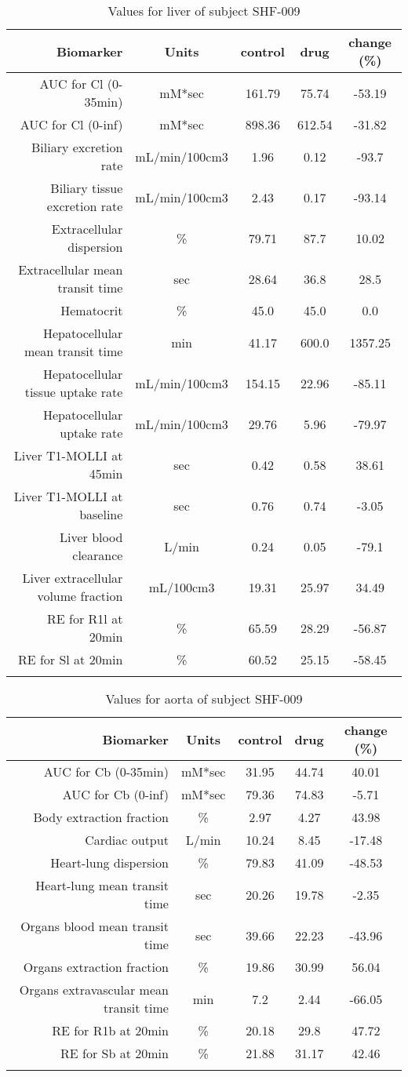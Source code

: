 \documentclass{epflreport}%
\begin{document}
%
\clearpage%
\begin{longtable}{rcccc}%
\hline%
Biomarker&Units&control&drug&change (\%)\\%
\hline%
AUC for Cl (0{-}35min)&mM*sec&161.79&75.74&{-}53.19\\%
AUC for Cl (0{-}inf)&mM*sec&898.36&612.54&{-}31.82\\%
Biliary excretion rate&mL/min/100cm3&1.96&0.12&{-}93.7\\%
Biliary tissue excretion rate&mL/min/100cm3&2.43&0.17&{-}93.14\\%
Extracellular dispersion&\%&79.71&87.7&10.02\\%
Extracellular mean transit time&sec&28.64&36.8&28.5\\%
Hematocrit&\%&45.0&45.0&0.0\\%
Hepatocellular mean transit time&min&41.17&600.0&1357.25\\%
Hepatocellular tissue uptake rate&mL/min/100cm3&154.15&22.96&{-}85.11\\%
Hepatocellular uptake rate&mL/min/100cm3&29.76&5.96&{-}79.97\\%
Liver T1{-}MOLLI at 45min&sec&0.42&0.58&38.61\\%
Liver T1{-}MOLLI at baseline&sec&0.76&0.74&{-}3.05\\%
Liver blood clearance&L/min&0.24&0.05&{-}79.1\\%
Liver extracellular volume fraction&mL/100cm3&19.31&25.97&34.49\\%
RE for R1l at 20min&\%&65.59&28.29&{-}56.87\\%
RE for Sl at 20min&\%&60.52&25.15&{-}58.45\\%
\hline%
\caption{Values for liver of subject SHF-009} \\%
\end{longtable}%
\begin{longtable}{rcccc}%
\hline%
Biomarker&Units&control&drug&change (\%)\\%
\hline%
AUC for Cb (0{-}35min)&mM*sec&31.95&44.74&40.01\\%
AUC for Cb (0{-}inf)&mM*sec&79.36&74.83&{-}5.71\\%
Body extraction fraction&\%&2.97&4.27&43.98\\%
Cardiac output&L/min&10.24&8.45&{-}17.48\\%
Heart{-}lung dispersion&\%&79.83&41.09&{-}48.53\\%
Heart{-}lung mean transit time&sec&20.26&19.78&{-}2.35\\%
Organs blood mean transit time&sec&39.66&22.23&{-}43.96\\%
Organs extraction fraction&\%&19.86&30.99&56.04\\%
Organs extravascular mean transit time&min&7.2&2.44&{-}66.05\\%
RE for R1b at 20min&\%&20.18&29.8&47.72\\%
RE for Sb at 20min&\%&21.88&31.17&42.46\\%
\hline%
\caption{Values for aorta of subject SHF-009} \\%
\end{longtable}%
\clearpage%
\end{document}
